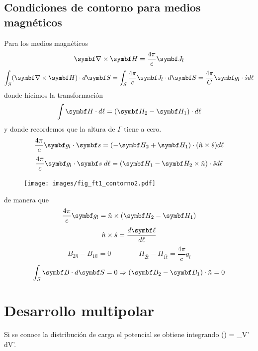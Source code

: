 \documentclass[10pt,oneside]{CBFT_book}
\begin{document}
%



\subsection{Condiciones de contorno para medios magnéticos}

Para los medios magnéticos
\[
	\rotorm{H} = \frac{4 \pi}{c} \vb{J}_l
\]
\[
	\int_S (\rotorm{H}) \cdot d\vb{S} = \int_S \frac{4 \pi}{c} \vb{J}_l \cdot d\vb{S} = 
	\frac{4 \pi}{C} \vb{g}_l\cdot \hat{s} d\ell
\]
donde hicimos la transformación
\[
	\int \vb{H}\cdot d\ell = (\vb{H}_2-\vb{H}_1)\cdot d\ell
\]
y donde recordemos que la altura de $\Gamma$ tiene a cero.
\[
	\frac{4 \pi}{c} \vb{g}_l \cdot \vb{s} = ( -\vb{H}_2 + \vb{H}_1 )\cdot( \hat{n} \times \hat{s} ) d\ell
\]
\[
	\frac{4 \pi}{c} \vb{g}_l \cdot \vb{s} \; d\ell = (\vb{H}_1 -\vb{H}_2 \times \hat{n})\cdot \hat{s} 
d\ell
\]

\begin{figure}[htb]
	\begin{center}
	\texttt{[image: images/fig\_ft1\_contorno2.pdf]}	 
	\end{center}
	\caption{}
\end{figure} 

de manera que 
\[
	\frac{4 \pi}{c} \vb{g}_l = \hat{n} \times ( \vb{H}_2 - \vb{H}_1 )
\]
\[
	\hat{n}\times\hat{s} = \frac{d\vb{\ell}}{d\ell} 
\]
\[
	B_{2\hat{n}} - B_{1\hat{n}} = 0 \qquad \qquad H_{2\hat{t}} - H_{1\hat{t}} = \frac{4 \pi}{c} g_l
\]
\[
	\int_S \vb{B}\cdot d\vb{S} = 0 \Rightarrow (\vb{B}_2 - \vb{B}_1 )\cdot\hat{n} = 0
\]

\section{Desarrollo multipolar}

Si se conoce la distribución de carga el potencial se obtiene integrando
\be
	\phi() = \int_{V'}  \; dV'.
	\label{integral_potencial}
\ee
\end{document}
